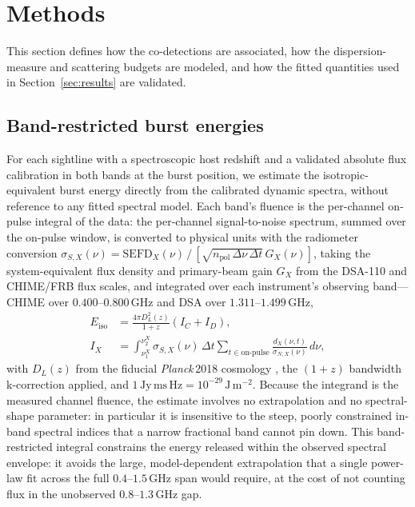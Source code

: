 \section{Methods}
\label{sec:methods}

This section defines how the co-detections are associated, how the
dispersion-measure and scattering budgets are modeled, and how the fitted
quantities used in Section~\ref{sec:results} are validated.




\subsection{Band-restricted burst energies}
\label{sec:methods-energies}

For each sightline with a spectroscopic host redshift and a validated absolute
flux calibration in both bands at the burst position, we estimate the
isotropic-equivalent burst energy directly from the calibrated dynamic
spectra, without reference to any fitted spectral model.
Each band's fluence
is the per-channel on-pulse integral of the data: the per-channel
signal-to-noise spectrum, summed over the on-pulse window, is converted to
physical units with the radiometer conversion
$\sigma_{S,X}(\nu) = \mathrm{SEFD}_X(\nu)\,/\,[\sqrt{n_{\mathrm{pol}}\,\Delta\nu\,\Delta t}\,G_X(\nu)]$,
taking the system-equivalent flux density and primary-beam gain $G_X$ from the
DSA-110 \citep{Law2024} and CHIME/FRB \citep{CHIMEFRB2018,Michilli2021} flux
scales, and integrated over each instrument's observing band---CHIME over
$0.400$--$0.800\,\mathrm{GHz}$ and DSA over $1.311$--$1.499\,\mathrm{GHz}$,
\begin{equation}
\begin{aligned}
E_{\mathrm{iso}} &= \frac{4\pi D_L^2(z)}{1+z}\left(I_C + I_D\right),\\
I_X &= \int_{\nu_1^{X}}^{\nu_2^{X}} \sigma_{S,X}(\nu)\,\Delta t
  \sum_{t \in \text{on-pulse}}
  \frac{d_X(\nu,t)}{\sigma_{N,X}(\nu)}\,d\nu,
\end{aligned}
\label{eq:eiso}
\end{equation}
with $D_L(z)$ from the fiducial \textit{Planck}\,2018 cosmology
\citep{Planck2018}, the $(1+z)$ bandwidth k-correction applied, and
$1\,\mathrm{Jy\,ms\,Hz} = 10^{-29}\,\mathrm{J\,m^{-2}}$. Because the
integrand is the measured channel fluence, the estimate involves no
extrapolation and no spectral-shape parameter: in particular it is
insensitive to the steep, poorly constrained in-band spectral indices that a
narrow fractional band cannot pin down. This
band-restricted integral constrains the energy released within the observed
spectral envelope: it avoids the large, model-dependent extrapolation that a
single power-law fit across the full $0.4$--$1.5\,\mathrm{GHz}$ span would
require, at the cost of not counting flux in the unobserved
$0.8$--$1.3\,\mathrm{GHz}$ gap.

